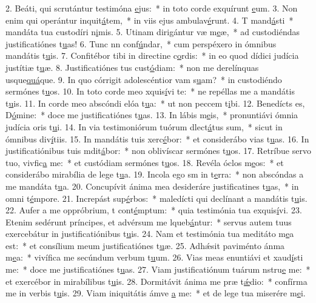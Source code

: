 2. Beáti, qui scrutántur testimóna \uline{e}jus:~* in toto corde exquírunt \uline{e}um.
3. Non enim qui operántur inquit\uline{á}tem,~* in viis ejus ambulav\uline{é}runt.
4. T mand\uline{á}sti~* mandáta tua custodíri n\uline{i}mis.
5. Utinam dirigántur væ m\uline{e}æ,~* ad custodiéndas justificatiónes t\uline{u}as!
6. Tunc nn conf\uline{ú}ndar,~* cum perspéxero in ómnibus mandátis t\uline{u}is.
7. Confitébor tibi in directine c\uline{o}rdis:~* in eo quod dídici judícia justítiæ t\uline{u}æ.
8. Justificatiónes tus cust\uline{ó}diam:~* non me derelínquas usque\uline{quá}que.
9. In quo córrigit adolescéntior vam s\uline{u}am?~* in custodiéndo sermónes t\uline{u}os.
10. In toto corde meo xquis\uline{í}vi te:~* ne repéllas me a mandátis t\uline{u}is.
11. In corde meo abscóndi elóa t\uline{u}a:~* ut non peccem t\uline{i}bi.
12. Benedícts es, D\uline{ó}mine:~* doce me justificatiónes t\uline{u}as.
13. In lábis m\uline{e}is,~* pronuntiávi ómnia judícia oris t\uline{u}i.
14. In via testimoniórum tuórum dlect\uline{á}tus sum,~* sicut in ómnibus div\uline{í}tiis.
15. In mandátis tuis xerc\uline{é}bor:~* et considerábo vias t\uline{u}as.
16. In justificatiónibus tuis mdit\uline{á}bor:~* non oblivíscar sermónes t\uline{u}os.
17. Retríbue servo tuo, vivfic\uline{a} me:~* et custódiam sermónes t\uline{u}os.
18. Revéla óclos m\uline{e}os:~* et considerábo mirabília de lege t\uline{u}a.
19. Incola ego sm in t\uline{e}rra:~* non abscóndas a me mandáta t\uline{u}a.
20. Concupívit ánima mea desideráre justificatines t\uline{u}as,~* in omni t\uline{é}mpore.
21. Increpást sup\uline{é}rbos:~* maledícti qui declínant a mandátis t\uline{u}is.
22. Aufer a me oppróbrium, t cont\uline{é}mptum:~* quia testimónia tua exquis\uline{í}vi.
23. Etenim sedérunt príncipes, et advérsum me lqueb\uline{á}ntur:~* servus autem tuus exercebátur in justificatiónibus t\uline{u}is.
24. Nam et testimónia tua meditáto m\uline{e}a est:~* et consílium meum justificatiónes t\uline{u}æ.
25. Adhǽsit paviménto ánma m\uline{e}a:~* vivífica me secúndum verbum t\uline{u}um.
26. Vias meas enuntiávi et xaud\uline{í}sti me:~* doce me justificatiónes t\uline{u}as.
27. Viam justificatiónum tuárum nstru\uline{e} me:~* et exercébor in mirabílibus t\uline{u}is.
28. Dormitávit ánima me præ t\uline{ǽ}dio:~* confírma me in verbis t\uline{u}is.
29. Viam iniquitátis ámve \uline{a} me:~* et de lege tua miserére m\uline{e}i.
